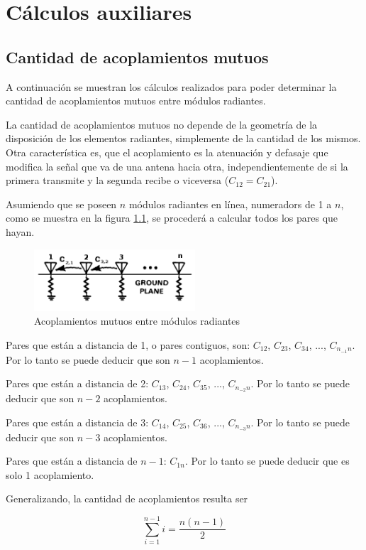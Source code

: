 
\chapter{Cálculos auxiliares} %

\label{AppendixA} %


\section{Cantidad de acoplamientos mutuos}

A continuación se muestran los cálculos realizados para poder determinar la cantidad de acoplamientos mutuos entre módulos
radiantes.

La cantidad de acoplamientos mutuos no depende de la geometría de la disposición de los elementos radiantes, simplemente de 
la cantidad de los mismos. Otra característica es, que el acoplamiento es la atenuación y defasaje que modifica la señal 
que va de una antena hacia otra, independientemente de si la primera transmite y la segunda recibe o viceversa 
($C_{12} = C_{21}$).

Asumiendo que se poseen $n$ módulos radiantes en línea, numeradors de 1 a $n$, como se muestra en la figura \ref{fig:RmsInARow},
se procederá a calcular todos los pares que hayan. 

\begin{figure}[H]
 \centering
 \includegraphics[width=6cm]{gfx/mutualCoupling.png}
 \caption{Acoplamientos mutuos entre módulos radiantes}
 \label{fig:RmsInARow}
\end{figure}

Pares que están a distancia de 1, o pares contiguos, son: $C_{12}$, $C_{23}$, $C_{34}$, ..., $C_{n_{-1}n}$. Por lo tanto se puede deducir
que son $n - 1$ acoplamientos.

Pares que están a distancia de 2: $C_{13}$, $C_{24}$, $C_{35}$, ..., $C_{n_{-2}n}$. Por lo tanto se puede deducir que son $n - 2$ acoplamientos.

Pares que están a distancia de 3: $C_{14}$, $C_{25}$, $C_{36}$, ..., $C_{n_{-3}n}$. Por lo tanto se puede deducir que son $n - 3$ acoplamientos.

Pares que están a distancia de $n - 1$: $C_{1n}$. Por lo tanto se puede deducir que es solo 1 acoplamiento. 

Generalizando, la cantidad de acoplamientos resulta ser 

\begin{equation}\label{eq:amountMutCoupling}
	\sum_{i = 1}^{n-1} i = \dfrac{n(n-1)}{2}
\end{equation}
